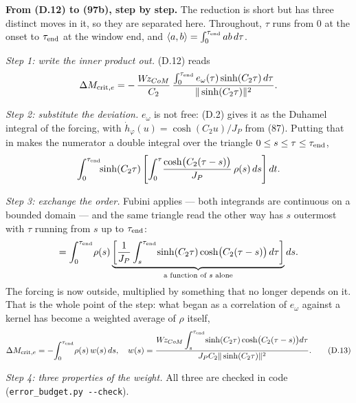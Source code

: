 \documentclass[11pt]{article}
\newcommand{\Wz}{W\!z_{CoM}}
\newcommand{\te}{\tau_{\rm end}}
\begin{document}
\textbf{From (D.12) to (97b), step by step.} The reduction is short but
has three distinct moves in it, so they are separated here. Throughout,
$\tau$ runs from $0$ at the onset to $\te$ at the window end, and
$\langle a,b\rangle = \int_0^{\te}ab\,d\tau$.

\emph{Step 1: write the inner product out.} (D.12) reads
\[
  \Delta M_{{\rm crit},e}
  = -\,\frac{\Wz}{C_2}\,
    \frac{\int_0^{\te} e_\omega(\tau)\sinh(C_2\tau)\,d\tau}
         {\|\sinh(C_2\tau)\|^2}.
\]

\emph{Step 2: substitute the deviation.} $e_\omega$ is not free: (D.2)
gives it as the Duhamel integral of the forcing, with
$\dot h_\varphi(u) = \cosh(C_2u)/J_P$ from (87). Putting that in makes
the numerator a double integral over the triangle
$0\le s\le\tau\le\te$,
\[
  \int_0^{\te}\!\!\sinh(C_2\tau)
  \left[\int_0^{\tau}\!\frac{\cosh\bigl(C_2(\tau-s)\bigr)}{J_P}\,
        \rho(s)\,ds\right]dt .
\]

\emph{Step 3: exchange the order.} Fubini applies --- both integrands
are continuous on a bounded domain --- and the same triangle read the
other way has $s$ outermost with $\tau$ running from $s$ up to $\te$:
\[
  = \int_0^{\te}\!\rho(s)
    \underbrace{\left[\frac{1}{J_P}\int_s^{\te}\!\sinh(C_2\tau)
      \cosh\bigl(C_2(\tau-s)\bigr)\,d\tau\right]}
     _{\text{a function of }s\text{ alone}}ds .
\]
The forcing is now outside, multiplied by something that no longer
depends on it. That is the whole point of the step: what began as a
correlation of $e_\omega$ against a kernel has become a weighted
average of $\rho$ itself,
\begin{equation}
  \Delta M_{{\rm crit},e} = -\!\int_0^{\te}\!\rho(s)\,w(s)\,ds,
  \quad
  w(s) = \frac{\Wz\displaystyle\int_s^{\te}\!\sinh(C_2\tau)
                \cosh\bigl(C_2(\tau-s)\bigr)d\tau}
              {J_PC_2\|\sinh(C_2\tau)\|^2}.
  \tag{D.13}
\end{equation}

\emph{Step 4: three properties of the weight.} All three are checked in
code (\texttt{error\_budget.py -{}-check}).
\end{document}
